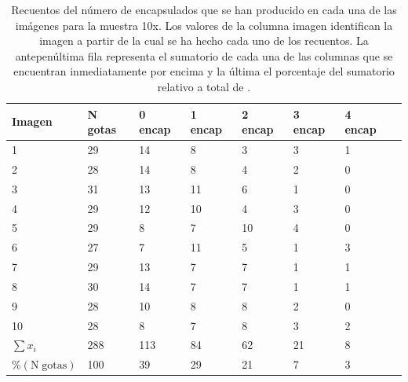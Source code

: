 \begin{spacing}{1}
\begin{table}[H]
\renewcommand\tablename{Tabla}
\renewcommand{\arraystretch}{1.5}
\centering
    
    \setlength{\extrarowheight}{-2pt}
    \begin{tabular}{ C{2cm} C{2cm} C{2cm} C{2cm} C{2cm} C{2cm} C{2cm} C{2cm} }
        \hline
        Imagen	& N gotas	& 0 encap & 1 encap & 2 encap & 3 encap & 4 encap \\
        \hline
        \hline
        
1	&	29	&	14	&	8	&	3	&	3	&	1	\\
2	&	28	&	14	&	8	&	4	&	2	&	0	\\
3	&	31	&	13	&	11	&	6	&	1	&	0	\\
4	&	29	&	12	&	10	&	4	&	3	&	0	\\
5	&	29	&	8	&	7	&	10	&	4	&	0	\\
6	&	27	&	7	&	11	&	5	&	1	&	3	\\
7	&	29	&	13	&	7	&	7	&	1	&	1	\\
8	&	30	&	14	&	7	&	7	&	1	&	1	\\
9	&	28	&	10	&	8	&	8	&	2	&	0	\\
10	&	28	&	8	&	7	&	8	&	3	&	2	\\

        \hline
        $\sum{x_i}$	& 288 & 113 & 84 & 62 & 21 & 8 \\
        \small{$\% \mathrm{(N\;gotas)}$}	& 100 & 39 & 29 & 21 & 7 & 3 \\
        \hline
    \end{tabular}

    \caption{\small Recuentos del número de encapsulados que se han producido en cada una de las imágenes para la muestra 10x. Los valores de la columna imagen identifican la imagen a partir de la cual se ha hecho cada uno de los recuentos. La antepenúltima fila representa el sumatorio de cada una de las columnas que se encuentran inmediatamente por encima y la última el porcentaje del sumatorio relativo a total de \gotas.}
    \label{tab:resultados_10x}
    
\end{table}
\end{spacing}



